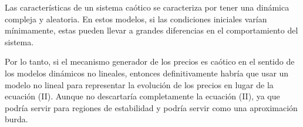 \begin{problema}
\begin{enumerate}
\begin{sol}
        Las características de un sistema caótico se caracteriza por tener una dinámica compleja y aleatoria. En estos modelos, si las condiciones iniciales varían mínimamente, estas pueden llevar a grandes diferencias en el comportamiento del sistema.

        Por lo tanto, si el mecanismo generador de los precios es caótico en el sentido de los modelos dinámicos no lineales, entonces definitivamente habría que usar un modelo no lineal para representar la evolución de los precios en lugar de la ecuación (II). Aunque no descartaría completamente la ecuación (II), ya que podría servir para regiones de estabilidad y podría servir como una aproximación burda. 
    \end{sol}
\end{enumerate}



\end{problema}


%
%

